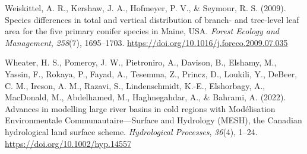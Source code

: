 \documentclass[
]{agujournal2019}
\newlength{\cslhangindent}
\newenvironment{CSLReferences}[2] %
 {\begin{list}{}{%
  \setlength{\itemindent}{0pt}
  \setlength{\leftmargin}{0pt}
  \setlength{\parsep}{0pt}
  \ifodd #1
   \setlength{\leftmargin}{\cslhangindent}
   \setlength{\itemindent}{-1\cslhangindent}
  \fi
  \setlength{\itemsep}{#2\baselineskip}}}
 {\end{list}}
\begin{document}
\begin{CSLReferences}{1}{0}
Weiskittel, A. R., Kershaw, J. A., Hofmeyer, P. V., \& Seymour, R. S.
(2009). Species differences in total and vertical distribution of
branch- and tree-level leaf area for the five primary conifer species in
{Maine}, {USA}. \emph{Forest Ecology and Management}, \emph{258}(7),
1695--1703. \url{https://doi.org/10.1016/j.foreco.2009.07.035}

Wheater, H. S., Pomeroy, J. W., Pietroniro, A., Davison, B., Elshamy,
M., Yassin, F., Rokaya, P., Fayad, A., Tesemma, Z., Princz, D., Loukili,
Y., DeBeer, C. M., Ireson, A. M., Razavi, S., Lindenschmidt, K.-E.,
Elshorbagy, A., MacDonald, M., Abdelhamed, M., Haghnegahdar, A., \&
Bahrami, A. (2022). Advances in modelling large river basins in cold
regions with {Mod{é}lisation Environmentale Communautaire}---{Surface}
and {Hydrology} ({MESH}), the {Canadian} hydrological land surface
scheme. \emph{Hydrological Processes}, \emph{36}(4), 1--24.
\url{https://doi.org/10.1002/hyp.14557}

\end{CSLReferences}
\end{document}
